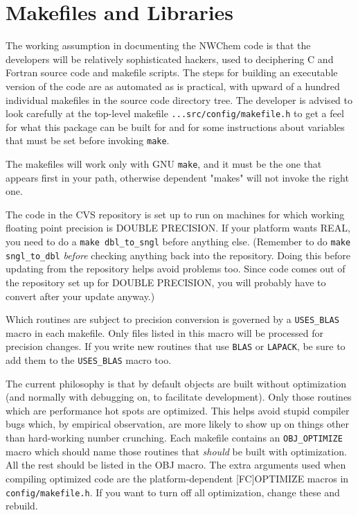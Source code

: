 \section{Makefiles and Libraries}
\label{sec:makelib}


The working assumption in documenting the NWChem code is that the
developers will be relatively sophisticated hackers, used to deciphering
C and Fortran source code and makefile scripts.  The steps for building
an executable version of the code are as automated as is practical, with
upward of a hundred individual makefiles in the source code directory
tree.  The developer is advised to look carefully at the top-level
makefile
{\tt ...src/config/makefile.h} to get a feel for what this package can
be built for and for some instructions about variables that must be set
before invoking {\tt make}.

The makefiles will work only with GNU {\tt make}, and it must be the one
that appears first in your path, otherwise dependent "makes" will not
invoke the right one.

The code in the CVS repository is set up to run on machines for
which working floating point precision is DOUBLE PRECISION.  If your
platform wants REAL, you need to do a {\tt make dbl\_to\_sngl} before
anything else.  (Remember to do {\tt make sngl\_to\_dbl} {\em before} checking
anything back into the repository.  Doing this before updating from
the repository helps avoid problems too.  Since code comes out of the
repository set up for DOUBLE PRECISION, you will probably have
to convert after your update anyway.)

Which routines are subject to precision conversion is governed by a
{\tt USES\_BLAS} macro in each makefile.  Only files listed in this macro
will be processed for precision changes.  If you write new routines
that use {\tt BLAS} or {\tt LAPACK}, be sure to add them to the {\tt USES\_BLAS} macro
too.

The current philosophy is that by default objects are built without
optimization (and normally with debugging on, to facilitate
development).  Only those routines which are performance hot spots are
optimized.  This helps avoid stupid compiler bugs which, by empirical
observation, are more likely to show up on things other than
hard-working number crunching.  Each makefile contains an {\tt OBJ\_OPTIMIZE}
macro which should name those routines that {\em should} be built with
optimization.  All the rest should be listed in the OBJ macro.  The
extra arguments used when compiling optimized code are the
platform-dependent [FC]OPTIMIZE macros in \verb+config/makefile.h+.  If you
want to turn off all optimization, change these and rebuild.

